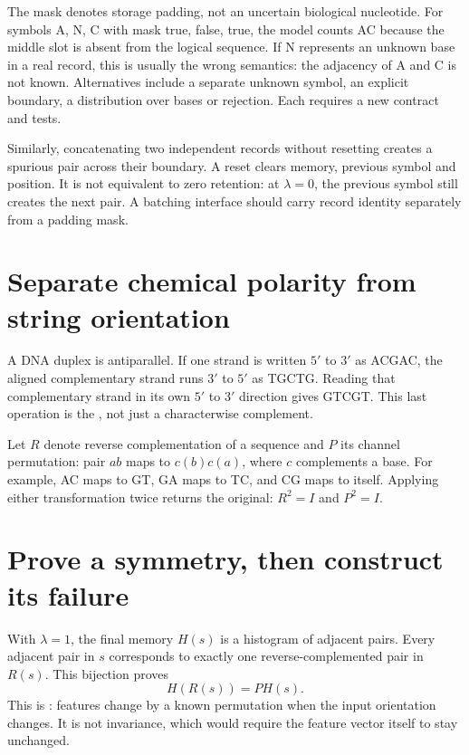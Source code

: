 The mask denotes storage padding, not an uncertain biological nucleotide.
For symbols A, N, C with mask true, false, true, the model counts AC because
the middle slot is absent from the logical sequence. If N represents an
unknown base in a real record, this is usually the wrong semantics: the
adjacency of A and C is not known. Alternatives include a separate unknown
symbol, an explicit boundary, a distribution over bases or rejection. Each
requires a new contract and tests.

Similarly, concatenating two independent records without resetting creates a
spurious pair across their boundary. A reset clears memory, previous symbol
and position. It is not equivalent to zero retention: at $\lambda=0$, the
previous symbol still creates the next pair. A batching interface should
carry record identity separately from a padding mask.

\section{Separate chemical polarity from string orientation}
A DNA duplex is antiparallel. If one strand is written $5'$ to $3'$ as
ACGAC, the aligned complementary strand runs $3'$ to $5'$ as TGCTG.
Reading that complementary strand in its own $5'$ to $3'$ direction gives
GTCGT. This last operation is the , not just a
characterwise complement.


Let $R$ denote reverse complementation of a sequence and $P$ its channel
permutation: pair $ab$ maps to $c(b)c(a)$, where $c$ complements a base.
For example, AC maps to GT, GA maps to TC, and CG maps to itself.
Applying either transformation twice returns the original: $R^2=I$ and
$P^2=I$.

\section{Prove a symmetry, then construct its failure}
With $\lambda=1$, the final memory $H(s)$ is a histogram of adjacent pairs.
Every adjacent pair in $s$ corresponds to exactly one reverse-complemented
pair in $R(s)$. This bijection proves
\begin{equation}
 H(R(s))=P H(s).
 \label{eq:equiv}
\end{equation}
This is : features change by a known permutation when
the input orientation changes. It is not invariance, which would require
the feature vector itself to stay unchanged.

